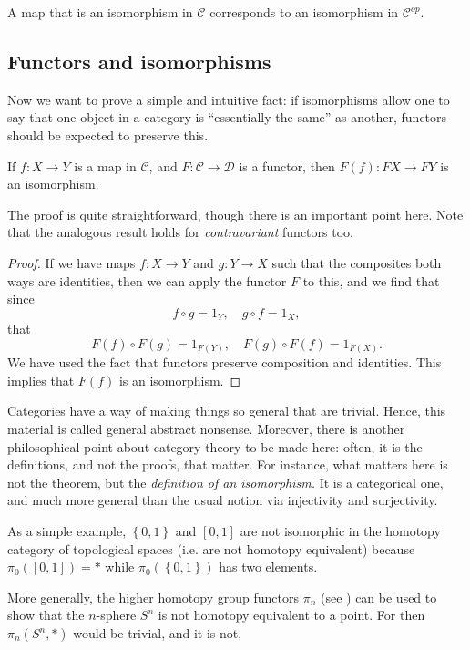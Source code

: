 \begin{exercise} 
A map that is an isomorphism in $\mathcal{C}$ corresponds to an isomorphism in
$\mathcal{C}^{op}$.
\end{exercise} 
\subsection{Functors and isomorphisms}
Now we want to prove a simple and intuitive fact: if isomorphisms allow one to
say that one object in a category is ``essentially the same'' as another,
functors should be expected to preserve this.
\begin{proposition}
If $f: X \to Y$ is a map in $\mathcal{C}$, and $F: \mathcal{C} \to \mathcal{D}$
is a functor, then $F(f): FX \to FY$ is an isomorphism.
\end{proposition}

The proof is quite straightforward, though there is an important point here.
Note that the analogous result holds for \emph{contravariant} functors too.

\begin{proof}
If we have maps $f: X \to Y$ and $g : Y \to X$ such that the composites both
ways are identities, then we can apply the functor $F$ to this, and we find
that since
\[ f \circ g = 1_Y, \quad g \circ f = 1_X,   \]
that
\[ F(f) \circ F(g) = 1_{F(Y)}, \quad F(g) \circ F(f) = 1_{F(X)}.  \]
We have used the fact that functors preserve composition and identities. This
implies that $F(f)$ is an isomorphism.
\end{proof}

Categories have a way of making things so general that are trivial. Hence,
this material is called general abstract nonsense.
Moreover, there is another philosophical point about category theory to
be made here: often, it is the definitions, and not the proofs, that matter.
For instance, what matters here is not the theorem, but the \emph{definition of
an
isomorphism.} It is a categorical one, and much more general than the usual
notion via injectivity and surjectivity.


\begin{example} 
As a simple example, $\left\{0,1\right\}$ and $[0,1]$ are not isomorphic in the
homotopy category of topological spaces (i.e. are not homotopy equivalent)
because $\pi_0([0,1]) = \ast$ while $\pi_0(\left\{0,1\right\}) $ has two
elements.
\end{example} 

\begin{example} 
More generally, the higher homotopy group functors  $\pi_n$ (see \cite{Ha02}) can be used to show
that the $n$-sphere $S^n$ is not homotopy equivalent to a point. For then
$\pi_n(S^n, \ast)$ would be trivial, and it is not.
\end{example} 


